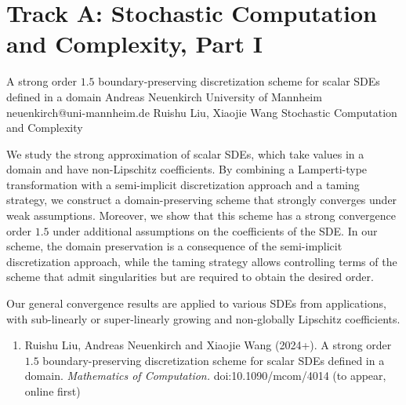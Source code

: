 \section{Track A: Stochastic Computation and Complexity, Part I}\newpage

\begin{talk}
  {A strong order $1.5$ boundary-preserving discretization scheme for scalar SDEs defined in a domain}%
  {Andreas Neuenkirch}%
  {University of Mannheim}%
  {neuenkirch@uni-mannheim.de}%
  {Ruishu Liu, Xiaojie Wang}%
  {Stochastic Computation and Complexity}%
    
   
We study the strong approximation of scalar SDEs, which take values in a domain and have non-Lipschitz coefficients.
By combining a Lamperti-type transformation with a semi-implicit discretization approach and a taming 
strategy,  we construct a domain-preserving scheme that strongly converges under weak assumptions. 
Moreover,
we show that this scheme has a strong convergence order $1.5$ under additional assumptions on the coefficients of the SDE. In our scheme, the domain preservation is a consequence of the semi-implicit discretization approach, while the taming strategy allows controlling terms of the scheme that admit singularities but are required to obtain the desired order.

Our general convergence results  are  applied to various SDEs from applications, with sub-linearly or super-linearly growing and non-globally Lipschitz coefficients.


\medskip

\begin{enumerate}
 \item[{[1]}]  Ruishu Liu, Andreas Neuenkirch and Xiaojie Wang (2024+). A strong order $1.5$
 boundary-preserving discretization scheme for scalar SDEs defined in a domain. {\it Mathematics of Computation.} doi:10.1090/mcom/4014 (to appear, online first)
\end{enumerate}

\end{talk}

